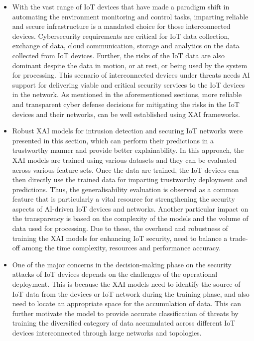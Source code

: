 \documentclass[journal]{IEEEtran}
\begin{document}
\begin{itemize}

    \item With the vast range of IoT devices that have made a paradigm shift in automating the environment monitoring and control tasks, imparting reliable and secure infrastructure is a mandated choice for those interconnected devices. Cybersecurity requirements are critical for IoT data collection, exchange of data, cloud communication, storage and analytics on the data collected from IoT devices. Further, the risks of the IoT data are also dominant despite the data in motion, or at rest, or being used by the system for processing. This scenario of interconnected devices under threats needs AI support for delivering viable and critical security services to the IoT devices in the network. As mentioned in the aforementioned sections, more reliable and transparent cyber defense decisions for mitigating the risks in the IoT devices and their networks, can be well established using XAI frameworks.
    
    \item Robust XAI models for intrusion detection and securing IoT networks were presented in this section, which can perform their predictions in a trustworthy manner and provide better explainability. In this approach, the XAI models are trained using various datasets and they can be evaluated across various feature sets. Once the data are trained, the IoT devices can then directly use the trained data for imparting trustworthy deployment and predictions. Thus, the generalisability evaluation is observed as a common feature that is particularly a vital resource for strengthening the security aspects of AI-driven IoT devices and networks. Another particular impact on the transparency is based on the complexity of the models and the volume of data used for processing. Due to these, the overhead and robustness of training the XAI models for enhancing IoT security, need to balance a trade-off among the time complexity, resources and performance accuracy.

    \item One of the major concerns in the decision-making phase on the security attacks of IoT devices depends on the challenges of the operational deployment. This is because the XAI models need to identify the source of IoT data from the devices or IoT network during the training phase, and also need to locate an appropriate space for the accumulation of data. This can further motivate the model to provide accurate classification of threats by training the diversified category of data accumulated across different IoT devices interconnected through large networks and topologies.

\end{itemize}
\end{document}
